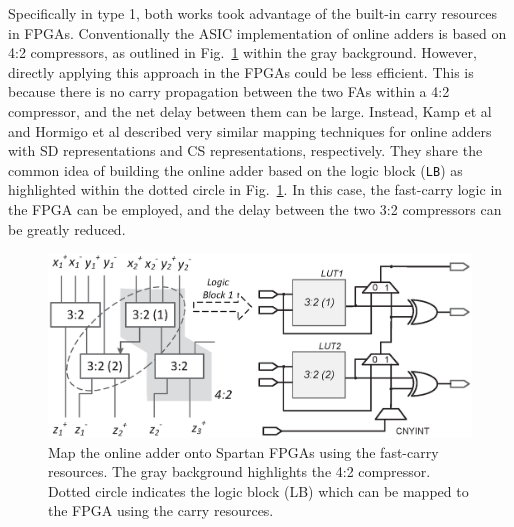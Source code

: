 \documentclass[conference]{IEEEtran}
\begin{document}
Specifically in type 1, both works took advantage of the built-in carry resources in FPGAs. Conventionally the ASIC implementation of online adders is based on 4:2 compressors, as outlined in Fig.~\ref{Fig:PreviousWork} within the gray background. However, directly applying this approach in the FPGAs could be less efficient. This is because there is no carry propagation between the two FAs within a 4:2 compressor, and the net delay between them can be large. Instead, Kamp et al \cite{FPT09RA} and Hormigo et al \cite{ASAP09RA} described very similar mapping techniques for online adders with SD representations and CS representations, respectively. They share the common idea of building the online adder based on the logic block (\texttt{LB}) as highlighted within the dotted circle in Fig.~\ref{Fig:PreviousWork}. In this case, the fast-carry logic in the FPGA can be employed, and the delay between the two 3:2 compressors can be greatly reduced.
%
\begin{figure}[tbp]
	\centering
	\includegraphics[width=.5\textwidth]{./Figures/SDAdder_42comp_Spartan.eps}
	\vspace{-4ex}
	\caption{Map the online adder onto Spartan FPGAs using the fast-carry resources. The gray background highlights the 4:2 compressor. Dotted circle indicates the logic block (LB) which can be mapped to the FPGA using the carry resources.}
	\vspace{-4ex}
	\label{Fig:PreviousWork}
\end{figure}
\end{document}
